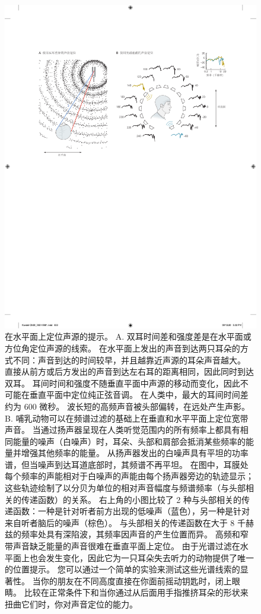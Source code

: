 \begin{figure}[htbp]
	\centering
	\includegraphics[width=1.0\linewidth]{chap28/fig_28_1}
	\caption{在水平面上定位声源的提示。
	A. 双耳时间差和强度差是在水平面或方位角定位声源的线索。
	在水平面上发出的声音到达两只耳朵的方式不同：声音到达的时间较早，并且越靠近声源的耳朵声音越大。
	直接从前方或后方发出的声音到达左右耳的距离相同，因此同时到达双耳。
	耳间时间和强度不随垂直平面中声源的移动而变化，因此不可能在垂直平面中定位纯正弦音调。
	在人类中，最大的耳间时间差约为 600 微秒。
	波长短的高频声音被头部偏转，在远处产生声影\cite{geisler1998sound}。
	B. 哺乳动物可以在频谱过滤的基础上在垂直和水平平面上定位宽带声音。
	当通过扬声器呈现在人类听觉范围内的所有频率上都具有相同能量的噪声（白噪声）时，耳朵、头部和肩部会抵消某些频率的能量并增强其他频率的能量。
	从扬声器发出的白噪声具有平坦的功率谱，但当噪声到达耳道底部时，其频谱不再平坦。
	在图中，耳膜处每个频率的声能相对于白噪声的声能由每个扬声器旁边的轨迹显示； 
	这些轨迹绘制了以分贝为单位的相对声音幅度与频谱频率（与头部相关的传递函数）的关系。
	右上角的小图比较了 2 种与头部相关的传递函数：一种是针对听者前方出现的低噪声（蓝色），另一种是针对来自听者脑后的噪声（棕色）。
	与头部相关的传递函数在大于 8 千赫兹的频率处具有深陷波，其频率因声音的产生位置而异。
	高频和窄带声音缺乏能量的声音很难在垂直平面上定位。
	由于光谱过滤在水平面上也会发生变化，因此它为一只耳朵失去听力的动物提供了唯一的位置提示。
	您可以通过一个简单的实验来测试这些光谱线索的显著性。
	当你的朋友在不同高度直接在你面前摇动钥匙时，闭上眼睛。
	比较在正常条件下和当你通过从后面用手指推挤耳朵的形状来扭曲它们时，你对声音定位的能力。}
	\label{fig:28_1}
\end{figure}


